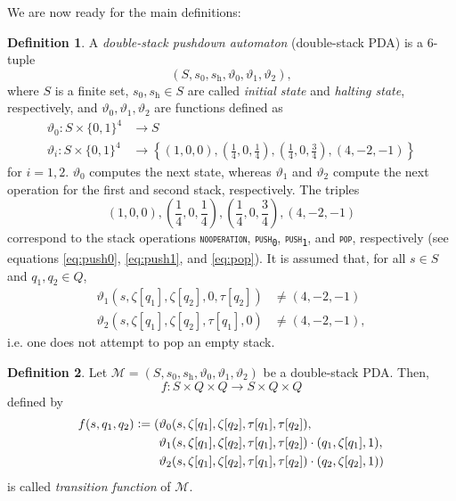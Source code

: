\documentclass{book}
\newcommand{\defeq}{\vcentcolon=}
\newcommand{\pushone}{\texttt{\textsc{push}}\textsubscript{\texttt{1}}}
\newcommand{\pushzero}{\texttt{\textsc{push}}\textsubscript{\texttt{0}}}
\newcommand{\pop}{\textsc{\texttt{pop}}}
\newcommand{\noop}{\textsc{\texttt{nooperation}}}
\newcommand{\h}{\mathrm{h}}
\theoremstyle{definition}
\newtheorem{definition}{Definition}[chapter]
\theoremstyle{plain}
\theoremstyle{plain}
\theoremstyle{remark}
\theoremstyle{plain}
\begin{document}
	We are now ready for the main definitions:
	
	\begin{definition}
		A \emph{double-stack pushdown automaton} (double-stack PDA) is a 6-tuple $$(S, s_0, s_\h, \vartheta_0, \vartheta_1, \vartheta_2),$$ where $S$ is a finite set, $s_0,s_\h \in S$ are called \emph{initial state} and \emph{halting state}, respectively, and $\vartheta_0,\vartheta_1,\vartheta_2$ are functions defined as
		\begin{align*}
			\vartheta_0:S \times \{0,1\}^4 &\to S \\
			\vartheta_i:S \times \{0,1\}^4 &\to \left\{(1,0,0),
													   \left(\frac{1}{4},0,\frac{1}{4}\right),
													   \left(\frac{1}{4},0,\frac{3}{4}\right),
													   (4,-2,-1)\right\}
		\end{align*}
		for $i=1,2$. $\vartheta_0$ computes the next state, whereas $\vartheta_1$ and $\vartheta_2$ compute the next operation for the first and second stack, respectively. The triples
		$$
			(1,0,0),\left(\frac{1}{4},0,\frac{1}{4}\right),\left(\frac{1}{4},0,\frac{3}{4}\right),(4,-2,-1)
		$$ 
		correspond to the stack operations \noop, \pushzero, \pushone, and \pop, respectively (see equations \ref{eq:push0}, \ref{eq:push1}, and \ref{eq:pop}). It is assumed that, for all $s \in S$ and $q_1,q_2 \in Q$,
		\begin{align*}
			\vartheta_1(s,\zeta[q_1],\zeta[q_2],0,\tau[q_2]) &\neq (4,-2,-1) \\
			\vartheta_2(s,\zeta[q_1],\zeta[q_2],\tau[q_1],0) &\neq (4,-2,-1),
		\end{align*}
		i.e. one does not attempt to pop an empty stack.	
	\end{definition}
	
	\begin{definition}
		Let $\mathcal{M}=(S,s_0,s_\h,\vartheta_0,\vartheta_1,\vartheta_2)$ be a double-stack PDA. Then, $$f:S \times Q \times Q \to S \times Q \times Q$$ defined by
		\begin{align*}
			f(s,q_1,q_2)\defeq( &\vartheta_0(s,\zeta[q_1],\zeta[q_2],\tau[q_1],\tau[q_2]), \\
								&\vartheta_1(s,\zeta[q_1],\zeta[q_2],\tau[q_1],\tau[q_2]) \cdot 
									(q_1,\zeta[q_1],1), \\
								&\vartheta_2(s,\zeta[q_1],\zeta[q_2],\tau[q_1],\tau[q_2]) \cdot
									(q_2,\zeta[q_2],1) )	
		\end{align*}
		is called \emph{transition function} of $\mathcal{M}$.
	\end{definition}
	
\end{document}
